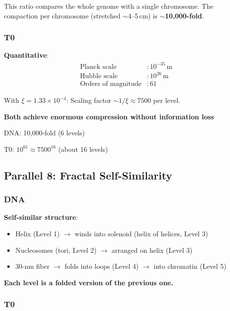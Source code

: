 	This ratio compares the whole genome with a single chromosome. The compaction per chromosome (stretched $\sim$4--5\,cm) is $\sim$\textbf{10,000-fold}.

	\subsubsection{T0}

	\textbf{Quantitative}:
	\begin{align}
		\text{Planck scale} &: 10^{-35}\,\text{m} \\
		\text{Hubble scale} &: 10^{26}\,\text{m} \\
		\text{Orders of magnitude} &: 61
	\end{align}

	With $\xi = 1.33 \times 10^{-4}$: Scaling factor $\sim 1/\xi \approx 7500$ per level.

	\begin{keyresult}
		\textbf{Both achieve enormous compression without information loss}

		DNA: 10,000-fold (6 levels)

		T0: $10^{61} \approx 7500^{16}$ (about 16 levels)
	\end{keyresult}

	\subsection{Parallel 8: Fractal Self-Similarity}

	\subsubsection{DNA}

	\textbf{Self-similar structure}:
	\begin{itemize}
		\item Helix (Level 1) $\to$ winds into solenoid (helix of helices, Level 3)
		\item Nucleosomes (tori, Level 2) $\to$ arranged on helix (Level 3)
		\item 30-nm fiber $\to$ folds into loops (Level 4) $\to$ into chromatin (Level 5)
	\end{itemize}

	\textbf{Each level is a folded version of the previous one.}

	\subsubsection{T0}

